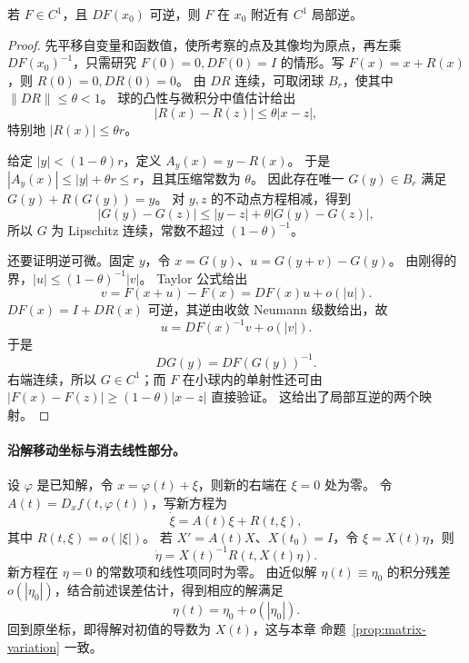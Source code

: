 \begin{theorem}[由压缩映射得到局部逆]\label{thm:local-inverse}
若 $F\in C^1$，且 $DF(x_0)$ 可逆，则 $F$ 在 $x_0$ 附近有 $C^1$ 局部逆。
\end{theorem}
\begin{proof}
先平移自变量和函数值，使所考察的点及其像均为原点，再左乘 $DF(x_0)^{-1}$，只需研究
$F(0)=0,DF(0)=I$ 的情形。写 $F(x)=x+R(x)$，则 $R(0)=0,DR(0)=0$。
由 $DR$ 连续，可取闭球 $B_r$，使其中 $\|DR\|\leq\theta<1$。
球的凸性与微积分中值估计给出
\[
 |R(x)-R(z)|\leq\theta|x-z|,
\]
特别地 $|R(x)|\leq\theta r$。

给定 $|y|<(1-\theta)r$，定义 $A_y(x)=y-R(x)$。
于是 $|A_y(x)|\leq|y|+\theta r\leq r$，且其压缩常数为 $\theta$。
因此存在唯一 $G(y)\in B_r$ 满足 $G(y)+R(G(y))=y$。
对 $y,z$ 的不动点方程相减，得到
\[
 |G(y)-G(z)|\leq|y-z|+\theta|G(y)-G(z)|,
\]
所以 $G$ 为 Lipschitz 连续，常数不超过 $(1-\theta)^{-1}$。

还要证明逆可微。固定 $y$，令 $x=G(y)$、$u=G(y+v)-G(y)$。
由刚得的界，$|u|\leq(1-\theta)^{-1}|v|$。
Taylor 公式给出 
\[
 v=F(x+u)-F(x)=DF(x)u+o(|u|).
\]
$DF(x)=I+DR(x)$ 可逆，其逆由收敛 Neumann 级数给出，故
\[
 u=DF(x)^{-1}v+o(|v|).
\]
于是 
\[
 DG(y)=DF(G(y))^{-1}.
\]
右端连续，所以 $G\in C^1$；而 $F$ 在小球内的单射性还可由
$|F(x)-F(z)|\geq(1-\theta)|x-z|$ 直接验证。
这给出了局部互逆的两个映射。
\end{proof}

\paragraph{沿解移动坐标与消去线性部分。}
设 $\varphi$ 是已知解，令 $x=\varphi(t)+\xi$，则新的右端在 $\xi=0$ 处为零。
令 $A(t)=D_xf(t,\varphi(t))$，写新方程为
\[
 \dot\xi=A(t)\xi+R(t,\xi),
\]
其中 $R(t,\xi)=o(|\xi|)$。
若 $X'=A(t)X$、$X(t_0)=I$，令 $\xi=X(t)\eta$，则
\[
 \dot\eta=X(t)^{-1}R(t,X(t)\eta).
\]
新方程在 $\eta=0$ 的常数项和线性项同时为零。
由近似解 $\eta(t)\equiv\eta_0$ 的积分残差
$o(|\eta_0|)$，结合前述误差估计，得到相应的解满足
\[
 \eta(t)=\eta_0+o(|\eta_0|).
\]
回到原坐标，即得解对初值的导数为 $X(t)$，这与本章
命题~\ref{prop:matrix-variation} 一致。

